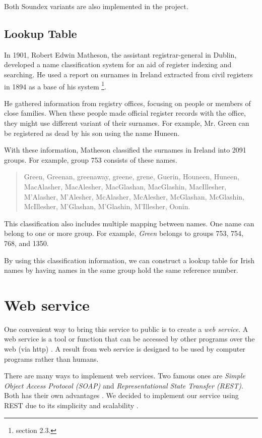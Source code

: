 Both Soundex variants are also implemented in the project.

\subsection{Lookup Table}

In 1901, Robert Edwin Matheson, the assistant registrar-general in Dublin,
developed a name classification system \cite{MathesonV} for an aid of register indexing
and searching. He used a report on surnames in Ireland extracted from
civil registers \cite{MathesonSR} in 1894 as a base of his system
\footnote{\cite{adamw} section 2.3.}.

He gathered information from registry offices, focusing on
people or members of close families. When these people made official
register records with the office, they might use different variant
of their surnames. For example, Mr. Green can be registered as dead
by his son using the name Huneen.

With these information, Matheson classified the surnames in Ireland
into 2091 groups. For example, group 753 consists of these names.

\begin{quotation} \noindent
Green, Greenan, greenaway, greene, grene, Guerin, Houneen, Huneen,
MacAlasher, MacAlesher, MacGlashan, MacGlashin, MacIllesher, M'Alasher,
M'Alesher, McAlasher, McAlesher, McGlashan, McGlashin, McIllesher,
M'Glashan, M'Glashin, M'Illesher, Oonin.
\end{quotation}

This classification also includes multiple mapping between names.
One name can belong to one or more group. For example, \emph{Green}
belongs to groups 753, 754, 768, and 1350.

By using this classification information, we can construct a lookup table
for Irish names by having names in the same group hold the same
reference number.

\section{Web service}

One convenient way to bring this service to public is to create a \emph{web service}.
A web service is a tool or function that can be accessed by other programs
over the web (via http) \cite{ws1}. A result from web service is designed
to be used by computer programs rather than humans.

There are many ways to implement web services. Two famous ones are
\emph{Simple Object Access Protocol (SOAP)} and
\emph{Representational State Transfer (REST)}.
Both has their own advantages \cite{ws2}. We decided to implement
our service using REST due to its simplicity and scalability \cite{ws3}\cite{ws4}.

